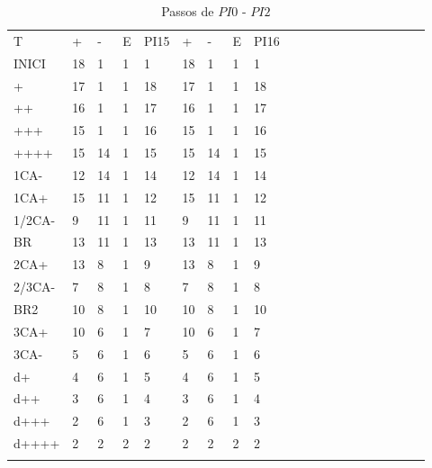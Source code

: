 \documentclass[12pt,a4paper]{report}
\begin{document}
\begin{table}[ht]
\caption{\label{tab:table-name} Passos de $PI0$ - $PI2$}
\centering
\begin{tabular}{ l l l l l l l l l l l l l l l l l l l l }
\hline
\hline
T      & +  & -  & E & PI15 & +  & -  & E & PI16 &  &  &  &  &  &  &  &  &  &  &  \\
INICI  & 18 & 1  & 1 & 1    & 18 & 1  & 1 & 1    &  &  &  &  &  &  &  &  &  &  &  \\
+      & 17 & 1  & 1 & 18   & 17 & 1  & 1 & 18   &  &  &  &  &  &  &  &  &  &  &  \\
++     & 16 & 1  & 1 & 17   & 16 & 1  & 1 & 17   &  &  &  &  &  &  &  &  &  &  &  \\
+++    & 15 & 1  & 1 & 16   & 15 & 1  & 1 & 16   &  &  &  &  &  &  &  &  &  &  &  \\
++++   & 15 & 14 & 1 & 15   & 15 & 14 & 1 & 15   &  &  &  &  &  &  &  &  &  &  &  \\
1CA-   & 12 & 14 & 1 & 14   & 12 & 14 & 1 & 14   &  &  &  &  &  &  &  &  &  &  &  \\
1CA+   & 15 & 11 & 1 & 12   & 15 & 11 & 1 & 12   &  &  &  &  &  &  &  &  &  &  &  \\
1/2CA- & 9  & 11 & 1 & 11   & 9  & 11 & 1 & 11   &  &  &  &  &  &  &  &  &  &  &  \\
BR     & 13 & 11 & 1 & 13   & 13 & 11 & 1 & 13   &  &  &  &  &  &  &  &  &  &  &  \\
2CA+   & 13 & 8  & 1 & 9    & 13 & 8  & 1 & 9    &  &  &  &  &  &  &  &  &  &  &  \\
2/3CA- & 7  & 8  & 1 & 8    & 7  & 8  & 1 & 8    &  &  &  &  &  &  &  &  &  &  &  \\
BR2    & 10 & 8  & 1 & 10   & 10 & 8  & 1 & 10   &  &  &  &  &  &  &  &  &  &  &  \\
3CA+   & 10 & 6  & 1 & 7    & 10 & 6  & 1 & 7    &  &  &  &  &  &  &  &  &  &  &  \\
3CA-   & 5  & 6  & 1 & 6    & 5  & 6  & 1 & 6    &  &  &  &  &  &  &  &  &  &  &  \\
d+     & 4  & 6  & 1 & 5    & 4  & 6  & 1 & 5    &  &  &  &  &  &  &  &  &  &  &  \\
d++    & 3  & 6  & 1 & 4    & 3  & 6  & 1 & 4    &  &  &  &  &  &  &  &  &  &  &  \\
d+++   & 2  & 6  & 1 & 3    & 2  & 6  & 1 & 3    &  &  &  &  &  &  &  &  &  &  &  \\
d++++  & 2  & 2  & 2 & 2    & 2  & 2  & 2 & 2    &  &  &  &  &  &  &  &  &  &  &  \\ \hline
       &    &    &   &      &    &    &   &      &  &  &  &  &  &  &  &  &  &  &  \\
       \hline
\end{tabular}
\end{table}
\end{document}
